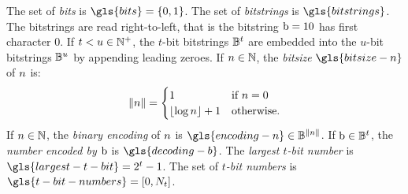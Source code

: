 
The set of \emph{bits} is $\gls{bits} = \set{0, 1}$.
The set of \emph{bitstrings} is $\gls{bitstrings}$.
The bitstrings are read right-to-left, that is the bitstring $\mathrm{b} = 10$ has
first character $0$. If $t < u \in \mathbb{N}^{+}$, the $t$-bit bitstrings
$\mathbb{B}^{t}$ are embedded into the $u$-bit bitstrings $\mathbb{B}^{u}$
by appending leading zeroes.
If $n \in \mathbb{N}$, the \emph{bitsize} $\gls{bitsize-n}$ of $n$ is:
\[
  \|n\| = \begin{cases}
    1 & \text{if } n = 0 \\
    \lfloor \log n \rfloor + 1 & \text{otherwise.}
  \end{cases}
\]
If $n \in \mathbb{N}$, the \emph{binary encoding} of $n$ is $\gls{encoding-n}
\in \tBitstrings{\bsz\nn}$.
If $\mathrm{b} \in \mathbb{B}^{t}$, the \emph{number encoded by $\mathrm{b}$} is
$\gls{decoding-b}$.
The \emph{largest $t$-bit number} is $\gls{largest-t-bit} = 2^t - 1$.
The set of \emph{$t$-bit numbers} is $\gls{t-bit-numbers} = [0, N_t]$.